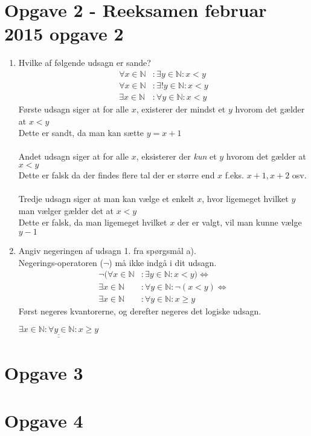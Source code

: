 \documentclass[20pt]{article}
\begin{document}
	\section*{Opgave 2 - Reeksamen februar 2015 opgave 2}
	\begin{enumerate}[label=(\alph*)]
		\item 
		Hvilke af følgende udsagn er sande?
		\begin{align*}
		\forall x \in \mathbb{N}\!&:\exists y \in \mathbb{N}\!: x<y\\
		\forall x \in \mathbb{N}\!&:\exists !y \in \mathbb{N}\!: x<y\\
		\exists x \in \mathbb{N}\!&:\forall y \in \mathbb{N}\!: x<y
		\end{align*}
		Første udsagn siger at for alle \(x\), existerer der mindst et \(y\) hvorom det gælder at \(x<y\)
		\\
		Dette er sandt, da man kan sætte \(y=x+1\)
		\\
		\\
		Andet udsagn siger at for alle \(x\), eksisterer der \emph{kun} et \(y\) hvorom det gælder at \(x<y\)
		\\
		Dette er falsk da der findes flere tal der er større end \(x\) f.eks. \(x+1, x+2\) osv.
		\\
		\\
		Tredje udsagn siger at man kan vælge et enkelt \(x\), hvor ligemeget hvilket \(y\) man vælger gælder det at \(x<y\)
		\\
		Dette er falsk, da man ligemeget hvilket \(x\) der er valgt, vil man kunne vælge \(y-1\)
		\\
		\item
		Angiv negeringen af udsagn 1. fra spørgsmål a).\\
		Negerings-operatoren (\(\neg\)) må ikke indgå i dit udsagn.
		\begin{align*}
		\neg(\forall x \in \mathbb{N}\!&:\exists y \in \mathbb{N}\!: x<y) \Leftrightarrow\\
		\exists x \in \mathbb{N}\!&:\forall y \in \mathbb{N}\!: \neg(x<y)\Leftrightarrow\\
		\exists x \in \mathbb{N}\!&:\forall y \in \mathbb{N}\!: x \geq y
		\end{align*}
		Først negeres kvantorerne, og derefter negeres det logiske udsagn.
		\begin{center}
			$\underline{\underline{\exists x \in \mathbb{N}\!:\forall y \in \mathbb{N}\!:x \geq y}}$\\
		\end{center}
	\end{enumerate}
	
	
	\section*{Opgave 3}
	
	
	
	\section*{Opgave 4}
	

	
	
	
	
\end{document}
